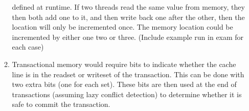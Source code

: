 \documentclass{report}
\begin{document}
\begin{enumerate}
\begin{enumerate}
    defined at runtime. If two threads read the same value from
    memory, they then both add one to it, and then write back one
    after the other, then the location will only be incremented
    once. The memory location could be incremented by either one two
    or three. (Include example run in exam for each case)
  \item Transactional memory would require bits to indicate whether
    the cache line is in the readset or writeset of the
    transaction. This can be done with two extra bits (one for each
    set). These bits are then used at the end of transactions
    (assuming lazy conflict detection) to determine whether it is safe
    to commit the transaction.
  \end{enumerate}
\end{enumerate}         
\end{document}
